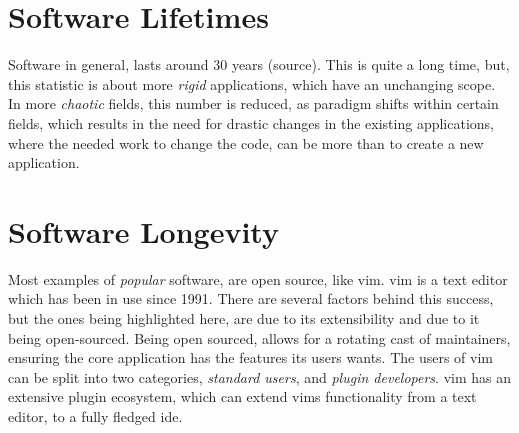 
\section{Software Lifetimes}

Software in general, lasts around 30 years (source). This is quite a long time,
but, this statistic is about more \textit{rigid} applications, which have an
unchanging scope. In more \textit{chaotic} fields, this number is reduced, as
paradigm shifts within certain fields, which results in the need for drastic
changes in the existing applications, where the needed work to change the code,
can be more than to create a new application.

\section{Software Longevity}

Most examples of \textit{popular} software, are open source, like \gls{vim}.
\gls{vim} is a text editor which has been in use since 1991. There are several
factors behind this success, but the ones being highlighted here, are due to its
extensibility and due to it being open-sourced. Being open sourced, allows for a
rotating cast of maintainers, ensuring the core application has the features its
users wants. The users of \gls{vim} can be split into two categories,
\textit{standard users}, and \textit{plugin developers}. \gls{vim} has an
extensive plugin ecosystem, which can extend \gls{vim}s functionality from a
text editor, to a fully fledged \gls{ide}.
